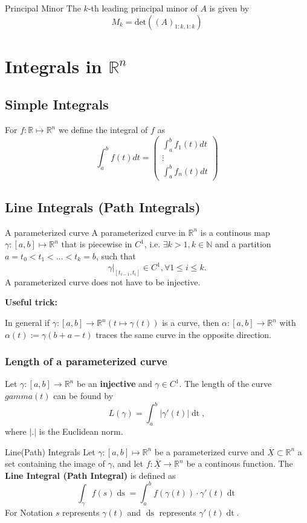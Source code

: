 \documentclass[a4paper,fontsize = 10pt]{article}
\def\R{\mathbb{R}}
\def\N{\mathbb{N}}
\def\X{\underline{\overline{X}}}
\begin{document}
\begin{subbox}{Principal Minor}
    The $k$-th leading principal minor of $A$ is given by 
    \[M_k = \text{det}\left((A)_{1:k,1:k}\right)\]
\end{subbox}


\section{Integrals in \texorpdfstring{\(\R^n\)}{Rⁿ}}
\subsection{Simple Integrals}
For \(f: \R \mapsto \R^n\) we define the integral of $f$ as
\[\int_a^b f(t)dt = 
\begin{pmatrix*}
  \int_a^b f_1(t) dt \\
  \vdots\\
  \int_a^b f_n(t) dt
\end{pmatrix*}
\]

\subsection{Line Integrals (Path Integrals)}
\begin{mainbox}{A parameterized curve}
    A parameterized curve in \(\R^n\) is a continous map \(\gamma: \left[a,b\right] \mapsto \R^n\) that is piecewise in \(C^1\), 
    i.e. \(\exists k > 1, k \in \N\) and a partition \(a = t_0 < t_1 < ... < t_k = b\), such that 
    \[\gamma|_{[t_{i-1}, t_i]} \in C^1, \forall 1 \leq i \leq k.\] 
    A parameterized curve does not have to be injective.
  \end{mainbox}
  \textbf{Useful trick:}

  In general if $\gamma: [a, b] \to \R^n (t \mapsto \gamma(t))$ is a curve, then $\alpha: [a,b] \to \R^n$ with $\alpha(t) := \gamma(b+a - t)$ traces the same curve in the opposite direction. 
  
  \subsubsection*{Length of a parameterized curve}
  Let $\gamma: [a, b] \to \R^n$ be an \textbf{injective} and $\gamma \in C^1$. The length of the curve $gamma(t)$ can be found by 
  \[L(\gamma) = \int_a^b |\gamma'(t)|\mathop{dt},\] where $|.|$ is the Euclidean norm.

\begin{mainbox}{Line(Path) Integrals}
    Let \(\gamma : \left[a,b\right] \mapsto \R^n\) be a parameterized curve and \(\X \subset \R^n\) a set containing the image of $\gamma$, and let $f: \X \to \R^n$ be a continous function. The \textbf{Line Integral (Path Integral)} is defined as 
    \[\int_\gamma f(s) \mathop{ds} = \int_a^b f(\gamma(t)) \cdot \gamma'(t) \mathop{dt}\]
    For Notation $s$ represents $\gamma(t)$ and $\mathop{ds}$ represents $\gamma'(t)\mathop{dt}$.
\end{mainbox}
\end{document}
